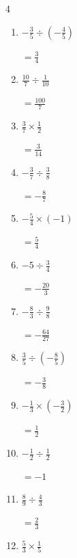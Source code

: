 \begin{multicols}{4}
\begin{enumerate}
        $\displaystyle =-\frac{1}{21}$

  \item $\displaystyle -\frac{3}{5}\div{}\left(-\frac{4}{5}\right)$

        $\displaystyle =\frac{3}{4}$

  \item $\displaystyle \frac{10}{7}\div{}\frac{1}{10}$

        $\displaystyle =\frac{100}{7}$

  \item $\displaystyle \frac{3}{7}\times{}\frac{1}{2}$

        $\displaystyle =\frac{3}{14}$

\columnbreak %

  \item $\displaystyle -\frac{3}{7}\div{}\frac{3}{8}$

        $\displaystyle =-\frac{8}{7}$

  \item $\displaystyle -\frac{5}{4}\times{}\left(-1\right)$

        $\displaystyle =\frac{5}{4}$

  \item $\displaystyle -5\div{}\frac{3}{4}$

        $\displaystyle =-\frac{20}{3}$

  \item $\displaystyle -\frac{8}{3}\div{}\frac{9}{8}$

        $\displaystyle =-\frac{64}{27}$

  \item $\displaystyle \frac{3}{5}\div{}\left(-\frac{8}{5}\right)$

        $\displaystyle =-\frac{3}{8}$

  \item $\displaystyle -\frac{1}{3}\times{}\left(-\frac{3}{2}\right)$

        $\displaystyle =\frac{1}{2}$

  \item $\displaystyle -\frac{1}{2}\div{}\frac{1}{2}$

        $\displaystyle =-1$

  \item $\displaystyle \frac{8}{9}\div{}\frac{4}{3}$

        $\displaystyle =\frac{2}{3}$

  \item $\displaystyle \frac{5}{3}\times{}\frac{1}{5}$


\end{enumerate}
\end{multicols}
